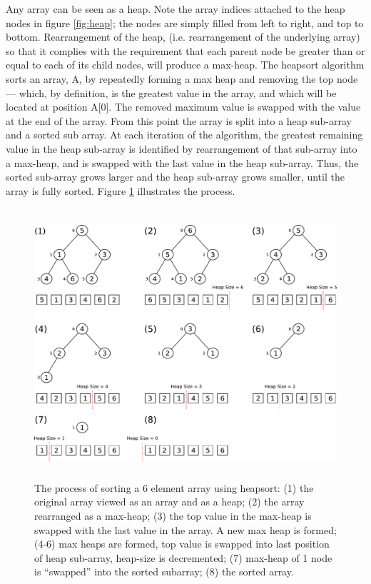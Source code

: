 \documentclass[12pt, a4paper]{article}
\begin{document}
Any array can be seen as a heap. Note the array indices attached to the heap nodes in figure \ref{fig:heap}; the nodes are simply filled from left to right, and top to bottom. Rearrangement of the heap, (i.e. rearrangement of the underlying array) so that it complies with the requirement that each parent node be greater than or equal to each of its child nodes, will produce a max-heap. The heapsort algorithm sorts an array, A, by repeatedly forming a max heap and removing the top node — which, by definition, is the greatest value in the array, and which will be located at position A[0]. The removed maximum value is swapped with the value at the end of the array. From this point the array is split into a heap sub-array and a sorted sub array. At each iteration of the algorithm, the greatest remaining value in the heap sub-array is identified by rearrangement of that sub-array into a max-heap, and is swapped with the last value in the heap sub-array. Thus, the sorted sub-array grows larger and the heap sub-array grows smaller, until the array is fully sorted. Figure \ref{fig:heapsort} illustrates the process.

\begin{figure}[H]
    \centering
    \includegraphics[height=10cm]{heap_sort2.pdf}
    \caption{\label{fig:heapsort}The process of sorting a 6 element array using heapsort: (1) the original array viewed as an array and as a heap; (2) the array rearranged as a max-heap; (3) the top value in the max-heap is swapped with the last value in the array. A new max heap is formed; (4-6) max heaps are formed, top value is swapped into last position of heap sub-array, heap-size is decremented; (7) max-heap of 1 node is   ``swapped'' into the sorted subarray; (8) the sorted array.}
\end{figure}
\end{document}
